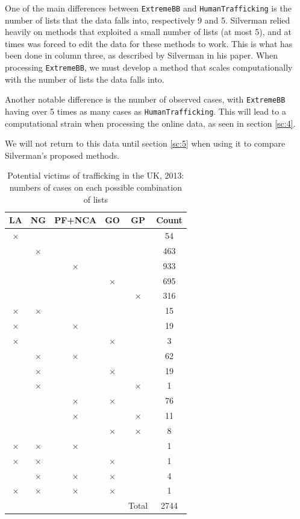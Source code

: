 \documentclass[10pt,a4paper,notitlepage]{article}
\begin{document}
One of the main differences between \texttt{ExtremeBB} and \texttt{HumanTrafficking} is the number of lists that the data falls into, respectively 9 and 5. Silverman relied heavily on methods that exploited a small number of lists (at most 5), and at times was forced to edit the data for these methods to work. This is what has been done in column three, as described by Silverman in his paper. When processing \texttt{ExtremeBB}, we must develop a method that scales computationally with the number of lists the data falls into.

Another notable difference is the number of observed cases, with \texttt{ExtremeBB} having over 5 times as many cases as \texttt{HumanTrafficking}. This will lead to a computational strain when processing the online data, as seen in section \ref{sc:4}.

We will not return to this data until section \ref{sc:5} when using it to compare Silverman's proposed methods.
\begin{table}[H]
\centering
\begin{tabular}{|ccccc|c|}
\hline LA & NG & PF+NCA & GO & GP & Count \\ \hline
$\times$&&&&& 54\\
&$\times$&&&& 463\\
&&$\times$&&& 933\\
&&&$\times$&& 695\\
&&&&$\times$& 316\\ \hline
$\times$&$\times$&&&& 15\\
$\times$&&$\times$&&& 19\\
$\times$&&&$\times$&& 3\\
&$\times$&$\times$&&& 62\\
&$\times$&&$\times$&& 19\\
&$\times$&&&$\times$& 1\\
&&$\times$&$\times$&& 76\\
&&$\times$&&$\times$& 11\\
&&&$\times$&$\times$& 8\\ \hline
$\times$&$\times$&$\times$&&& 1\\
$\times$&$\times$&&$\times$&& 1\\
&$\times$&$\times$&$\times$&& 4\\ \hline
$\times$&$\times$&$\times$&$\times$&& 1\\ \hline
&&&&Total&2744\\ \hline
\end{tabular}
\caption{Potential victims of trafficking in the UK, 2013: numbers of cases on each possible combination of lists}\label{tb:3}
\end{table}
\end{document}
